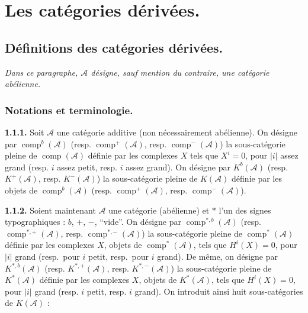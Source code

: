\chapter{Les catégories dérivées.}
%
\begingroup
\small
\setlength{\parskip}{0pt}
\setlength{\emergencystretch}{1.5em}
\setlength{\abovedisplayskip}{4pt plus 2pt minus 2pt}%
\setlength{\belowdisplayskip}{4pt plus 2pt minus 2pt}%

\section{Définitions des catégories dérivées.}

\noindent\textit{Dans ce paragraphe, $\mathcal A$ désigne, sauf mention du
contraire, une catégorie abélienne.}

\subsection{Notations et terminologie.}

\noindent\textbf{1.1.1.}\quad
Soit $\mathcal A$ une catégorie additive (non nécessairement abélienne). On
désigne par $\operatorname{comp}^{b}(\mathcal A)$ (resp.
$\operatorname{comp}^{+}(\mathcal A)$, resp.
$\operatorname{comp}^{-}(\mathcal A)$) la sous-catégorie pleine de
$\operatorname{comp}(\mathcal A)$ définie par les complexes $X$ tels que
$X^i=0$, pour $|i|$ assez grand (resp. $i$ assez petit, resp. $i$ assez
grand). On désigne par $K^{b}(\mathcal A)$ (resp. $K^{+}(\mathcal A)$,
resp. $K^{-}(\mathcal A)$) la sous-catégorie pleine de $K(\mathcal A)$
définie par les objets de $\operatorname{comp}^{b}(\mathcal A)$ (resp.
$\operatorname{comp}^{+}(\mathcal A)$, resp.
$\operatorname{comp}^{-}(\mathcal A)$).

\noindent\textbf{1.1.2.}\quad
Soient maintenant $\mathcal A$ une catégorie (abélienne) et $*$ l'un des
signes typographiques : $b$, $+$, $-$, ``vide''. On désigne par
$\operatorname{comp}^{*,b}(\mathcal A)$ (resp.
$\operatorname{comp}^{*,+}(\mathcal A)$, resp.
$\operatorname{comp}^{*,-}(\mathcal A)$) la sous-catégorie pleine de
$\operatorname{comp}^{*}(\mathcal A)$ définie par les complexes $X$, objets
de $\operatorname{comp}^{*}(\mathcal A)$, tels que $H^i(X)=0$, pour $|i|$
grand (resp.\ pour $i$ petit, resp.\ pour $i$ grand). De même, on désigne par
$K^{*,b}(\mathcal A)$ (resp. $K^{*,+}(\mathcal A)$, resp.
$K^{*,-}(\mathcal A)$) la sous-catégorie pleine de $K^{*}(\mathcal A)$
définie par les complexes $X$, objets de $K^{*}(\mathcal A)$, tels que
$H^i(X)=0$, pour $|i|$ grand (resp. $i$ petit, resp. $i$ grand). On introduit
ainsi huit sous-catégories de $K(\mathcal A)$ :


